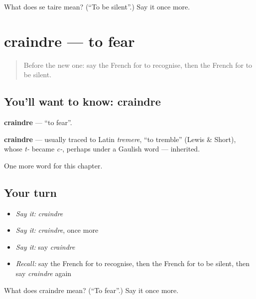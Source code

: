\begin{tcolorbox}[breakable,colback=teal!4,colframe=teal!35!black,title={Before you move on}]
What does se taire mean? (\textquotedblleft{}To be silent\textquotedblright{}.) Say it once more.
\end{tcolorbox}
\section[craindre]{craindre — to fear}

\label{lesson:FR-C211-craindre}



\begin{quote}
Before the new one: say the French for to recognise, then the French for to be silent.
\end{quote}

\subsection*{You'll want to know: craindre}
\textbf{craindre} — \textquotedblleft{}to fear\textquotedblright{}.

\begin{cousinweb}
\textbf{craindre} — usually traced to Latin \emph{tremere}, \textquotedblleft{}to tremble\textquotedblright{} (Lewis \& Short), whose \emph{t-} became \emph{c-}, perhaps under a Gaulish word — inherited.
\end{cousinweb}

\begin{grammarlens}[title={What you've built}]
One more word for this chapter.
\end{grammarlens}

\subsection*{Your turn}
\begin{itemize}
\raggedright
  \item \emph{Say it:} \emph{craindre}
  \item \emph{Say it:} \emph{craindre}, once more
  \item \emph{Say it:} say \emph{craindre}
  \item \emph{Recall:} say the French for to recognise, then the French for to be silent, then say \emph{craindre} again
\end{itemize}

\begin{tcolorbox}[breakable,colback=teal!4,colframe=teal!35!black,title={Before you move on}]
What does craindre mean? (\textquotedblleft{}To fear\textquotedblright{}.) Say it once more.
\end{tcolorbox}
